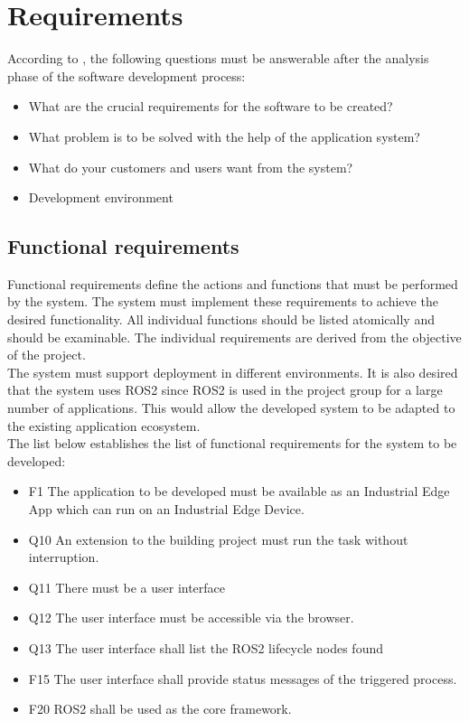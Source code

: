 	\section{Requirements}
	According to \cite{Koubaa2021}, the following questions must be answerable after the analysis phase of the software development process:
	\begin{itemize}
		\item What are the crucial requirements for the software to be created?
		\item What problem is to be solved with the help of the application system?
		\item What do your customers and users want from the system?
		\item Development environment
	\end{itemize}

\subsection{Functional requirements}
Functional requirements define the actions and functions that must be performed by the system. The system must implement these requirements to achieve the desired functionality. All individual functions should be listed atomically and should be examinable. The individual requirements are derived from the objective of the project.\\ 

The system must support deployment in different environments. It is also desired that the system uses ROS2 since ROS2 is used in the project group for a large number of applications. This would allow the developed system to be adapted to the existing application ecosystem.\\

The list below establishes the list of functional requirements for the system to be developed:
\begin{itemize}
	\item F1 The application to be developed must be available as an Industrial Edge App which can run on an Industrial Edge Device.
	\item  	Q10 An extension to the building project must run the task without interruption.
	\item 	Q11 There must be a user interface
	\item 	Q12 The user interface must be accessible via the browser.
	\item 	Q13 The user interface shall list the ROS2 lifecycle nodes found
	\item 	F15 The user interface shall provide status messages of the triggered process.
	\item 	F20 ROS2 shall be used as the core framework.
\end{itemize}

